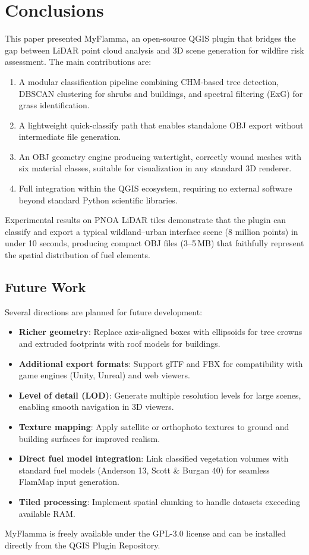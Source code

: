 \section{Conclusions}
\label{sec:conclusions}

This paper presented MyFlamma, an open-source QGIS plugin that bridges the gap between LiDAR point cloud analysis and 3D scene generation for wildfire risk assessment. The main contributions are:

\begin{enumerate}
    \item A modular classification pipeline combining CHM-based tree detection, DBSCAN clustering for shrubs and buildings, and spectral filtering (ExG) for grass identification.
    \item A lightweight quick-classify path that enables standalone OBJ export without intermediate file generation.
    \item An OBJ geometry engine producing watertight, correctly wound meshes with six material classes, suitable for visualization in any standard 3D renderer.
    \item Full integration within the QGIS ecosystem, requiring no external software beyond standard Python scientific libraries.
\end{enumerate}

Experimental results on PNOA LiDAR tiles demonstrate that the plugin can classify and export a typical wildland--urban interface scene (8 million points) in under 10 seconds, producing compact OBJ files (3--5\,MB) that faithfully represent the spatial distribution of fuel elements.

\subsection{Future Work}

Several directions are planned for future development:

\begin{itemize}
    \item \textbf{Richer geometry}: Replace axis-aligned boxes with ellipsoids for tree crowns and extruded footprints with roof models for buildings.
    \item \textbf{Additional export formats}: Support glTF and FBX for compatibility with game engines (Unity, Unreal) and web viewers.
    \item \textbf{Level of detail (LOD)}: Generate multiple resolution levels for large scenes, enabling smooth navigation in 3D viewers.
    \item \textbf{Texture mapping}: Apply satellite or orthophoto textures to ground and building surfaces for improved realism.
    \item \textbf{Direct fuel model integration}: Link classified vegetation volumes with standard fuel models (Anderson 13, Scott \& Burgan 40) for seamless FlamMap input generation.
    \item \textbf{Tiled processing}: Implement spatial chunking to handle datasets exceeding available RAM.
\end{itemize}

MyFlamma is freely available under the GPL-3.0 license and can be installed directly from the QGIS Plugin Repository.
